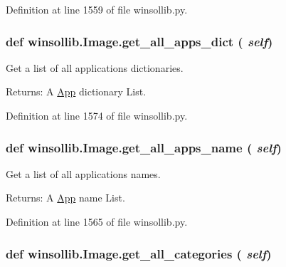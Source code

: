 Definition at line 1559 of file winsollib.py.\hypertarget{classwinsollib_1_1Image_65153a650cfb8b15c1abef650016bedb}{
\subsubsection[get\_\-all\_\-apps\_\-dict]{\setlength{\rightskip}{0pt plus 5cm}def winsollib.Image.get\_\-all\_\-apps\_\-dict ( {\em self})}}
\label{classwinsollib_1_1Image_65153a650cfb8b15c1abef650016bedb}


Get a list of all applications dictionaries. 

\begin{Desc}
\item[Returns:]A \hyperlink{classwinsollib_1_1App}{App} dictionary List. \end{Desc}


Definition at line 1574 of file winsollib.py.\hypertarget{classwinsollib_1_1Image_a35d3730e224b170900b56c6c47734a7}{
\subsubsection[get\_\-all\_\-apps\_\-name]{\setlength{\rightskip}{0pt plus 5cm}def winsollib.Image.get\_\-all\_\-apps\_\-name ( {\em self})}}
\label{classwinsollib_1_1Image_a35d3730e224b170900b56c6c47734a7}


Get a list of all applications names. 

\begin{Desc}
\item[Returns:]A \hyperlink{classwinsollib_1_1App}{App} name List. \end{Desc}


Definition at line 1565 of file winsollib.py.\hypertarget{classwinsollib_1_1Image_6ed36dc88fffd97bb08f117e1f25cae2}{
\subsubsection[get\_\-all\_\-categories]{\setlength{\rightskip}{0pt plus 5cm}def winsollib.Image.get\_\-all\_\-categories ( {\em self})}}
\label{classwinsollib_1_1Image_6ed36dc88fffd97bb08f117e1f25cae2}


